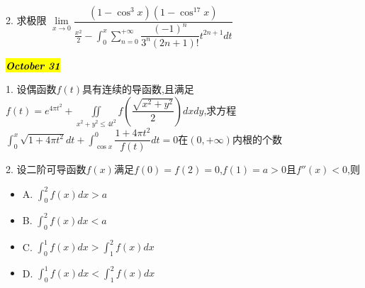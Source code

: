 2. 求极限 $\lim\limits_{x\rightarrow 0 }\dfrac{(1-\cos^3 x)(1-\cos^{17} x)}{\frac{x^2}{2}-\int_{0}^{x}\sum\limits_{n=0}^{+\infty}\dfrac{(-1)^n}{3^n(2n+1)!}t^{2n+1}dt}$
\begin{solution}
	
\end{solution}

\hl{\textbf{\textit{October 31}}}

1. 设偶函数$f(t)$具有连续的导函数,且满足$f(t)=e^{4\pi t^2}+\iint\limits_{x^2+y^2\leq 4t^2}f(\dfrac{\sqrt{x^2+y^2}}{2})dxdy$,求方程$\int_{0}^{x}\sqrt{1+4\pi t^2}dt+\int_{\cos x}^{0}\dfrac{1+4\pi t^2}{f(t)}dt=0$在$(0,+\infty)$内根的个数
\begin{solution}
	
\end{solution}

2. 设二阶可导函数$f(x)$满足$f(0)=f(2)=0$,$f(1)=a>0$且$f''(x)<0$,则
\begin{itemize}
	\item A. $\int_{0}^{2}f(x)dx>a$
	\item B. $\int_{0}^{2}f(x)dx<a$
	\item C. $\int_{0}^{1}f(x)dx>\int_{1}^{2}f(x)dx$
	\item D. $\int_{0}^{1}f(x)dx<\int_{1}^{2}f(x)dx$
\end{itemize}
\begin{solution}
	
\end{solution}
